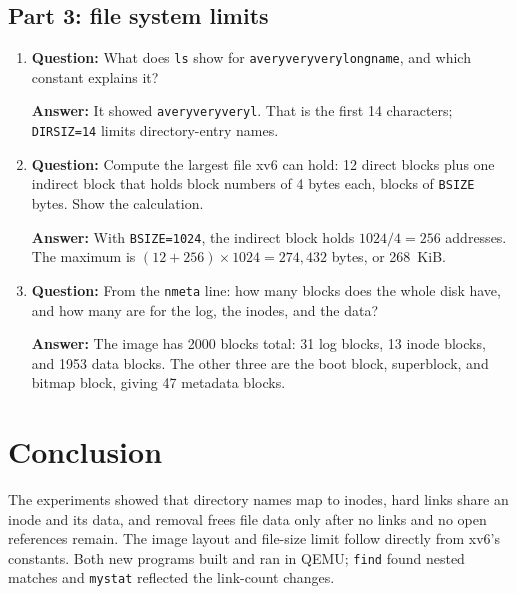 \documentclass[12pt]{article}
\begin{document}
\subsection{Part 3: file system limits}
\begin{enumerate}
\item \textbf{Question:} What does \texttt{ls} show for \texttt{averyveryverylongname}, and which constant explains it?
\par\textbf{Answer:} It showed \texttt{averyveryveryl}.
That is the first 14 characters; \texttt{DIRSIZ=14} limits directory-entry names.

\item \textbf{Question:} Compute the largest file xv6 can hold: 12 direct blocks plus one indirect block that holds block numbers of 4 bytes each, blocks of \texttt{BSIZE} bytes. Show the calculation.
\par\textbf{Answer:} With \texttt{BSIZE=1024}, the indirect block holds $1024/4=256$ addresses. The maximum is $(12+256)\times1024=274{,}432$ bytes, or 268~KiB.

\item \textbf{Question:} From the \texttt{nmeta} line: how many blocks does the whole disk have, and how many are for the log, the inodes, and the data?
\par\textbf{Answer:} The image has 2000 blocks total: 31 log blocks, 13 inode blocks, and 1953 data blocks. The other three are the boot block, superblock, and bitmap block, giving 47 metadata blocks.
\end{enumerate}

\section{Conclusion}
The experiments showed that directory names map to inodes, hard links share
an inode and its data, and removal frees file data only after no links and no
open references remain. The image layout and file-size limit follow directly
from xv6's constants. Both new programs built and ran in QEMU; \texttt{find}
found nested matches and \texttt{mystat} reflected the link-count changes.
\end{document}
